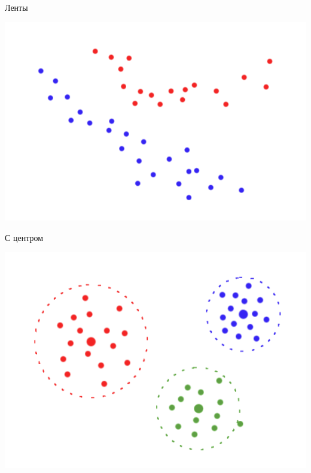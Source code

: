 \documentclass[10pt]{beamer}
\begin{document}
\begin{frame}{Ленты}
	\begin{center}
	  \includegraphics[height=0.6 \textheight, keepaspectratio = true]{images/cluster2}  
	\end{center}
\end{frame}

\begin{frame}{С центром}
	\begin{center}
	  \includegraphics[height=0.6 \textheight, keepaspectratio = true]{images/cluster3}  
	\end{center}
\end{frame}
\end{document}
